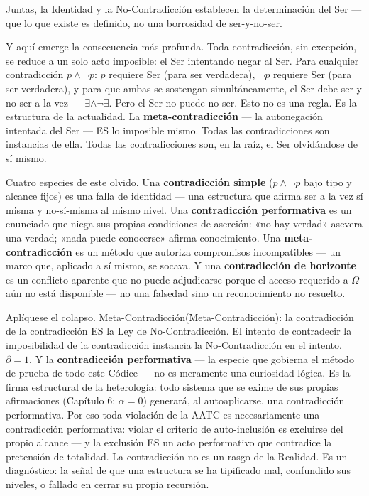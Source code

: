 \documentclass[10pt, openany, oneside]{book}
\begin{document}
\vspace{0.8em}

\noindent Juntas, la Identidad y la No-Contradicción establecen la determinación del Ser --- que lo que existe es definido, no una borrosidad de ser-y-no-ser.

Y aquí emerge la consecuencia más profunda. Toda contradicción, sin excepción, se reduce a un solo acto imposible: el Ser intentando negar al Ser. Para cualquier contradicción $p \wedge \neg p$: $p$ requiere Ser (para ser verdadera), $\neg p$ requiere Ser (para ser verdadera), y para que ambas se sostengan simultáneamente, el Ser debe ser y no-ser a la vez --- $\exists \wedge \neg\exists$. Pero el Ser no puede no-ser. Esto no es una regla. Es la estructura de la actualidad. La \textbf{meta-contradicción} --- la autonegación intentada del Ser --- ES lo imposible mismo. Todas las contradicciones son instancias de ella. Todas las contradicciones son, en la raíz, el Ser olvidándose de sí mismo.

Cuatro especies de este olvido. Una \textbf{contradicción simple} ($p \wedge \neg p$ bajo tipo y alcance fijos) es una falla de identidad --- una estructura que afirma ser a la vez sí misma y no-sí-misma al mismo nivel. Una \textbf{contradicción performativa} es un enunciado que niega sus propias condiciones de aserción: «no hay verdad» asevera una verdad; «nada puede conocerse» afirma conocimiento. Una \textbf{meta-contradicción} es un método que autoriza compromisos incompatibles --- un marco que, aplicado a sí mismo, se socava. Y una \textbf{contradicción de horizonte} es un conflicto aparente que no puede adjudicarse porque el acceso requerido a $\Omega$ aún no está disponible --- no una falsedad sino un reconocimiento no resuelto.

Aplíquese el colapso. Meta-Contradicción(Meta-Contradicción): la contradicción de la contradicción ES la Ley de No-Contradicción. El intento de contradecir la imposibilidad de la contradicción instancia la No-Contradicción en el intento. $\partial = 1$. Y la \textbf{contradicción performativa} --- la especie que gobierna el método de prueba de todo este Códice --- no es meramente una curiosidad lógica. Es la firma estructural de la heterología: todo sistema que se exime de sus propias afirmaciones (Capítulo 6: $\alpha = 0$) generará, al autoaplicarse, una contradicción performativa. Por eso toda violación de la AATC es necesariamente una contradicción performativa: violar el criterio de auto-inclusión es excluirse del propio alcance --- y la exclusión ES un acto performativo que contradice la pretensión de totalidad. La contradicción no es un rasgo de la Realidad. Es un diagnóstico: la señal de que una estructura se ha tipificado mal, confundido sus niveles, o fallado en cerrar su propia recursión.
\end{document}
